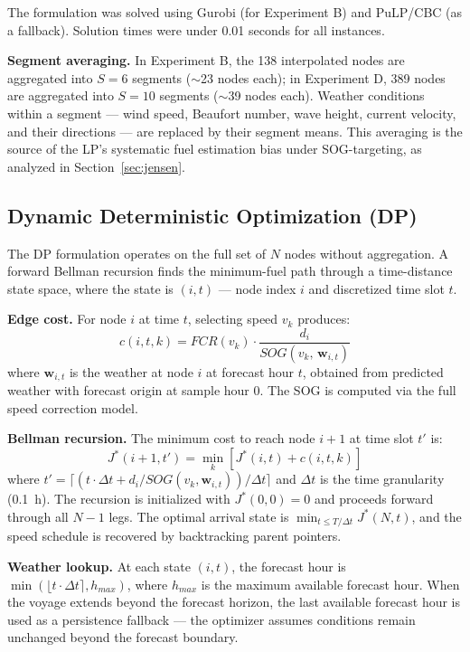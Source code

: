 \documentclass[review]{elsarticle}
\begin{document}
The formulation was solved using Gurobi (for Experiment B) and PuLP/CBC (as a fallback). Solution times were under 0.01 seconds for all instances.

\textbf{Segment averaging.} In Experiment B, the 138 interpolated nodes are aggregated into $S = 6$ segments ($\sim$23 nodes each); in Experiment D, 389 nodes are aggregated into $S = 10$ segments ($\sim$39 nodes each). Weather conditions within a segment --- wind speed, Beaufort number, wave height, current velocity, and their directions --- are replaced by their segment means. This averaging is the source of the LP's systematic fuel estimation bias under SOG-targeting, as analyzed in Section~\ref{sec:jensen}.

\subsection{Dynamic Deterministic Optimization (DP)}
\label{sec:dp}

The DP formulation operates on the full set of $N$ nodes without aggregation. A forward Bellman recursion finds the minimum-fuel path through a time-distance state space, where the state is $(i, t)$ --- node index $i$ and discretized time slot $t$.

\textbf{Edge cost.} For node $i$ at time $t$, selecting speed $v_k$ produces:
\begin{equation}
    c(i, t, k) = FCR(v_k) \cdot \frac{d_i}{SOG(v_k,\, \mathbf{w}_{i,t})}
    \label{eq:dp-cost}
\end{equation}
where $\mathbf{w}_{i,t}$ is the weather at node $i$ at forecast hour $t$, obtained from predicted weather with forecast origin at sample hour 0. The SOG is computed via the full speed correction model.

\textbf{Bellman recursion.} The minimum cost to reach node $i+1$ at time slot $t'$ is:
\begin{equation}
    J^*(i+1, t') = \min_{k} \left[ J^*(i, t) + c(i, t, k) \right]
    \label{eq:bellman}
\end{equation}
where $t' = \lceil (t \cdot \Delta t + d_i / SOG(v_k, \mathbf{w}_{i,t})) / \Delta t \rceil$ and $\Delta t$ is the time granularity (0.1~h). The recursion is initialized with $J^*(0, 0) = 0$ and proceeds forward through all $N-1$ legs. The optimal arrival state is $\min_{t \leq T/\Delta t} J^*(N, t)$, and the speed schedule is recovered by backtracking parent pointers.

\textbf{Weather lookup.} At each state $(i, t)$, the forecast hour is $\min(\lfloor t \cdot \Delta t \rceil, h_{max})$, where $h_{max}$ is the maximum available forecast hour. When the voyage extends beyond the forecast horizon, the last available forecast hour is used as a persistence fallback --- the optimizer assumes conditions remain unchanged beyond the forecast boundary.
\end{document}
